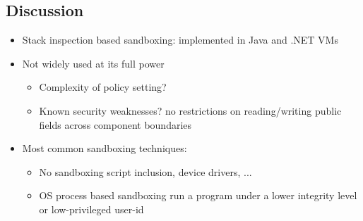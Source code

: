 \documentclass[12pt,titlepage,a4paper]{report}
\begin{document}
	\subsection{Discussion}
	\begin{itemize}
		\item Stack inspection based sandboxing: implemented in Java and .NET VMs
		\item Not widely used at its full power
		\begin{itemize}
			\item Complexity of policy setting?
			\item Known security weaknesses?
				\subitem no restrictions on reading/writing public fields across component boundaries
		\end{itemize}
		\item Most common sandboxing techniques:
		\begin{itemize}
			\item No sandboxing
				\subitem script inclusion, device drivers, ...
			\item OS process based sandboxing
				\subitem run a program under a lower integrity level or low-privileged user-id
		\end{itemize}
	\end{itemize}
\end{document}
